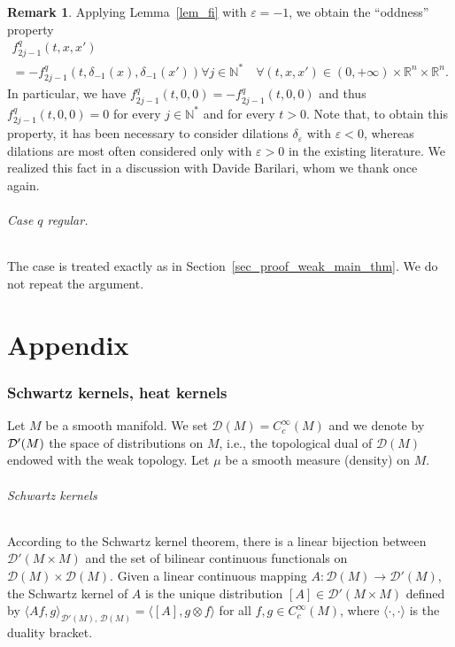 \documentclass[10pt]{amsart}
\theoremstyle{definition}\newtheorem{defi}[theo]{Definition}\newtheorem{rema}[theo]{Remark}\newtheorem{exam}[theo]{Example}\newtheorem{exem}[theo]{Example}\newtheorem{nota}[theo]{Notation}
\newcommand*\R{\mathbb{R}}
\newcommand*\N{\mathbb{N}}
\newcommand{\calD}{\mathcal{D}}
\let\oldforall\forall
\renewcommand*{\forall}{\mathrel{\oldforall}}
\begin{document}
\begin{rema}
Applying Lemma~\ref{lem_fi} with $\varepsilon=-1$, we obtain the ``oddness'' property
\begin{multline*}
f^{q}_{2j-1}(t,x,x')\\
 = -f^{q}_{2j-1}\left(t,\delta_{-1}(x),\delta_{-1}(x')\right) 
\forall j\in\N^*\quad\forall (t,x,x')\in(0,+\infty)\times\R^n\times\R^n.
\end{multline*}
In particular, we have $f^{q}_{2j-1}(t,0,0) = -f^{q}_{2j-1}(t,0,0)$ and thus $f^{q}_{2j-1}(t,0,0)=0$ for every $j\in\N^*$ and for every $t>0$. Note that, to obtain this property, it has been necessary to consider dilations $\delta_\varepsilon$ with $\varepsilon<0$, whereas dilations are most often considered only with $\varepsilon>0$ in the existing literature. We realized this fact in a discussion with Davide Barilari, whom we thank once again.
\end{rema}


\paragraph{Case $q$ regular.} The case is treated exactly as in Section~\ref{sec_proof_weak_main_thm}. We do not repeat the argument.



\goodbreak
\appendix
{\Large
\part{Appendix}\label{part_appendix}
}


 
\section{Schwartz kernels, heat kernels}\label{appendix_Schwartz}
Let $M$ be a smooth manifold. We set $\calD(M)=C_c^\infty(M)$ and we denote by $\calD'\linebreak(M)$ the space of distributions on $M$, i.e., the topological dual of $\calD(M)$ endowed with the weak topology. Let $\mu$ be a smooth measure (density) on $M$.



\goodbreak
\paragraph{Schwartz kernels}
According to the Schwartz kernel theorem, there is a linear bijection between $\calD'(M\times M)$ and the set of bilinear continuous functionals on $\calD(M)\times \calD(M)$. Given a linear continuous mapping $A: \calD(M)\rightarrow \calD'(M)$, the Schwartz kernel of $A$ is the unique distribution $[A]\in \calD'(M\times M)$ defined by $\langle Af,g\rangle_{\calD'(M),\,\calD(M)} = \langle [A],g\otimes f\rangle$ for all $f,g\in C_c^\infty(M)$, where $\langle\cdot,\cdot\rangle$ is the duality bracket.
\end{document}
